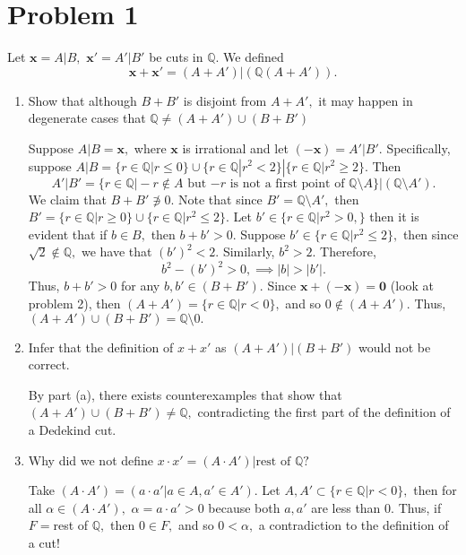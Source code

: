 \documentclass[11pt]{article}
\newcommand{\bbQ}{\mathbb{Q}}
\newcommand{\sm}{\setminus}
\begin{document}
	
	
	\psetheader

\section*{Problem 1}
\begin{problem}
    Let $\textbf{x} = A | B,$ $\textbf{x}' = A'| B'$ be cuts in $\bbQ.$ We defined
    \[\textbf{x} + \textbf{x}' = (A + A')  | (\bbQ (A + A')).\]
\end{problem}
\begin{enumerate}
    \item \begin{problem}
        Show that although $B + B'$ is disjoint from $A + A',$ it may happen in degenerate cases that $\bbQ \neq (A + A') \cup (B + B')$
    \end{problem}
    \begin{solution}
        Suppose $A | B = \textbf{x},$ where $\textbf{x}$ is irrational and let $(-\textbf{x}) = A' | B'.$ Specifically, suppose $A | B = \{r \in \bbQ | r \leq 0\} \cup \{r \in \bbQ | r^2 <2\} | \{r\in \bbQ | r^2 \geq 2\}.$ Then \[A' | B' = \{r\in \bbQ | -r \notin A\text{ but } {-r} \text{ is not a first point of }\bbQ \setminus A\} | (\bbQ \sm A').\] We claim that $B + B' \not \ni 0.$ Note that since $B' = \bbQ \sm A',$ then $B' = \{r\in \bbQ | r\geq 0\} \cup \{r\in \bbQ | r^2\leq 2\}.$ Let $b' \in \{r\in \bbQ  | r^2> 0,\}$ then it is evident that if $b \in B,$ then $b + b' >0.$ Suppose $b' \in \{r\in \bbQ | r^2\leq 2\},$ then since $\sqrt{2}\notin \bbQ,$ we have that $(b')^2<2.$ Similarly, $b^2 >2.$ Therefore, \[b^2 - (b')^2 > 0,\implies |b|>|b'|.\] Thus, $b + b' >0$ for any $b,b' \in (B + B').$ Since $\textbf{x} + (-\textbf{x}) = \textbf{0}$ (look at problem 2), then $(A + A') = \{r\in \bbQ | r<0\},$ and so $0\notin (A+A').$ Thus, $(A + A')\cup (B+B') = \bbQ\sm 0.$
    \end{solution}
    \item \begin{problem}
        Infer that the definition of $x + x'$ as $(A + A') | (B + B')$ would not be correct.
    \end{problem}
    \begin{solution}
        By part (a), there exists counterexamples that show that $(A + A') \cup (B + B') \neq \bbQ,$ contradicting the first part of the definition of a Dedekind cut.
    \end{solution}
    \item 
    \begin{problem}
        Why did we not define $x \cdot x' = (A \cdot A') | \text{rest of } \bbQ?$
    \end{problem}
    \begin{solution}
        Take $(A\cdot A') = (a\cdot a' | a\in A, a'\in A').$ Let $A,A'\subset \{r\in \bbQ | r< 0\},$ then for all $\alpha\in (A \cdot A'),$ $\alpha = a\cdot a' >0$ because both $a,a'$ are less than $0.$ Thus, if $F = $rest of $\bbQ,$ then $0\in F,$ and so $0<\alpha,$ a contradiction to the definition of a cut! 
    \end{solution}
\end{enumerate}
\end{document}
